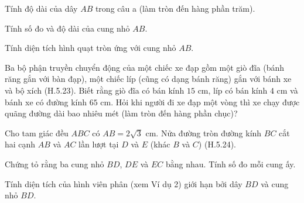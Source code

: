 \begin{exercises}
\begin{questions}[resume=SGK]
\begin{questions}
            \answerline
            \answerline

            \item Tính độ dài của dây $AB$ trong câu a (làm tròn đến hàng phần trăm).

            \answerline
            \answerline

            \item Tính số đo và độ dài của cung nhỏ $AB$.

            \answerline
            \answerline

            \item Tính diện tích hình quạt tròn ứng với cung nhỏ $AB$.

            \answerline
            \answerline
        \end{questions}

        \item Ba bộ phận truyền chuyển động của một chiếc xe đạp gồm một giò đĩa (bánh răng gắn với bàn đạp), một chiếc líp (cũng có dạng bánh răng) gắn với bánh xe và bộ xích (H.5.23). Biết rằng giò đĩa có bán kính $15$ cm, líp có bán kính $4$ cm và bánh xe có đường kính $65$ cm. Hỏi khi người đi xe đạp một vòng thì xe chạy được quãng đường dài bao nhiêu mét (làm tròn đến hàng phần chục)?


        \answerline
        \answerline
        \answerline

        \item Cho tam giác đều $ABC$ có $AB=2\sqrt{3}$ cm. Nửa đường tròn đường kính $BC$ cắt hai cạnh $AB$ và $AC$ lần lượt tại $D$ và $E$ (khác $B$ và $C$) (H.5.24).


        \begin{questions}
            \item Chứng tỏ rằng ba cung nhỏ $BD$, $DE$ và $EC$ bằng nhau. Tính số đo mỗi cung ấy.

            \answerline
            \answerline
            \answerline

            \item Tính diện tích của hình viên phân (xem Ví dụ 2) giới hạn bởi dây $BD$ và cung nhỏ $BD$.

            \answerline
            \answerline
            \answerline
        \end{questions}
    \end{questions}
\end{exercises}
